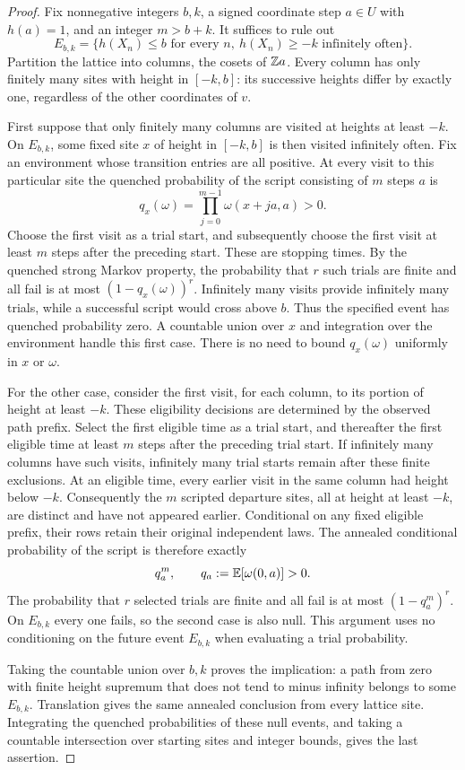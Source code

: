 \begin{proof}
Fix nonnegative integers $b,k$, a signed coordinate step $a\in U$ with
$h(a)=1$, and an integer $m>b+k$.  It suffices to rule out
\[
 E_{b,k}=\{h(X_n)\le b\text{ for every }n,
                  \ h(X_n)\ge-k\text{ infinitely often}\}.
\]
Partition the lattice into columns, the cosets of $\mathbb Z a$.  Every column
has only finitely many sites with height in $[-k,b]$: its successive
heights differ by exactly one, regardless of the other coordinates of
$v$.

First suppose that only finitely many columns are visited at heights at
least $-k$.  On $E_{b,k}$, some fixed site $x$ of height in $[-k,b]$ is
then visited infinitely often.  Fix an environment whose transition
entries are all positive.  At every visit to this particular site the
quenched probability of the script consisting of $m$ steps $a$ is
\[
 q_x(\omega)=\prod_{j=0}^{m-1}\omega(x+ja,a)>0.
\]
Choose the first visit as a trial start, and subsequently choose the
first visit at least $m$ steps after the preceding start.  These are
stopping times.  By the quenched strong Markov property, the probability
that $r$ such trials are finite and all fail is at most
$(1-q_x(\omega))^r$.  Infinitely many visits provide infinitely many
trials, while a successful script would cross above $b$.  Thus the
specified event has quenched probability zero.  A countable union over
$x$ and integration over the environment handle this first case.  There
is no need to bound $q_x(\omega)$ uniformly in $x$ or $\omega$.

For the other case, consider the first visit, for each column, to its
portion of height at least $-k$.  These eligibility decisions are
determined by the observed path prefix.  Select the first eligible time
as a trial start, and thereafter the first eligible time at least $m$
steps after the preceding trial start.  If infinitely many columns have
such visits, infinitely many trial starts remain after these finite
exclusions.  At an eligible time, every earlier visit in the same
column had height below $-k$.  Consequently the $m$ scripted departure
sites, all at height at least $-k$, are distinct and have not appeared
earlier.  Conditional on any fixed eligible prefix, their rows retain
their original independent laws.  The annealed conditional probability
of the script is therefore exactly
\[
 q_a^m,\qquad q_a:=\mathbb E[\omega(0,a)]>0.
\]
The probability that $r$ selected trials are finite and all fail is at
most $(1-q_a^m)^r$.  On $E_{b,k}$ every one fails, so the second case is
also null.  This argument uses no conditioning on the future event
$E_{b,k}$ when evaluating a trial probability.

Taking the countable union over $b,k$ proves the implication: a path
from zero with finite height supremum that does not tend to minus
infinity belongs to some $E_{b,k}$.  Translation gives the same
annealed conclusion from every lattice site.  Integrating the quenched
probabilities of these null events, and taking a countable intersection
over starting sites and integer bounds, gives the last assertion.
\end{proof}


